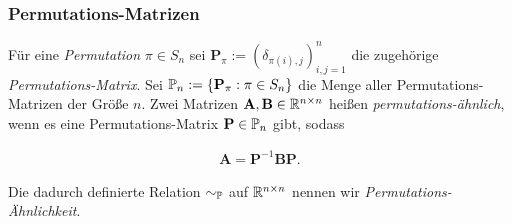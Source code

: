             \subsubsection{Permutations-Matrizen}

                \begin{definition}

                    Für eine \textit{Permutation} $\pi \in S_n$ sei $\mathbf P_\pi := (\delta_{\pi(i), j})_{i, j = 1}^n$ die zugehörige \textit{Permutations-Matrix}.
                    Sei $\P_n := \Bbraces{\mathbf P_\pi: \pi \in S_n}$ die Menge aller Permutations-Matrizen der Größe $n$.
                    Zwei Matrizen $\mathbf A, \mathbf B \in \R^{n \times n}$ heißen \textit{permutations-ähnlich}, wenn es eine Permutations-Matrix $\mathbf P \in \P_n$ gibt, sodass

                    \begin{align*}
                        \mathbf A = \mathbf P^{-1} \mathbf B \mathbf P.
                    \end{align*}

                    Die dadurch definierte Relation $\sim_{\P}$ auf $\R^{n \times n}$ nennen wir \textit{Permutations-Ähnlichkeit}.

                \end{definition}

